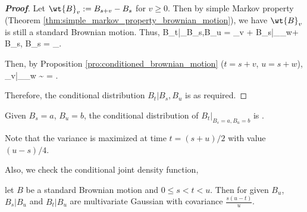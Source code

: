 \begin{proof}[\bf Proof]
Let $\wt{B}_v := B_{s+v} - B_s$ for $v\geq 0$. Then by simple Markov property (Theorem \ref{thm:simple_markov_property_brownian_motion}), we have $\wt{B}_v$ is still a standard Brownian motion. Thus,
\be
B_t|_{B_s,B_u} = _v + B_s|_{_w+ B_s, B_s} = _{}.
\ee

Then, by Proposition \ref{pro:conditioned_brownian_motion} ($t = s+v$, $u = s+w$),
\be
{}_v|_{_w} \sim \sN{} = \sN{}.
\ee

Therefore, the conditional distribution $B_t|B_s,B_u$ is as required.
\end{proof}

\begin{example}
Given $B_s = a$, $B_u = b$, the conditional distribution of $B_t|_{B_s =a,B_u=b}$ is
\be
\sN{}.
\ee

Note that the variance is maximized at time $t = (s+u)/2$ with value $(u-s)/4$.
\end{example}

Also, we check the conditional joint density function,%

\begin{lemma}\label{lem:joint_conditional_brownian_motion}
let $B$ be a standard Brownian motion and $0\leq s<t<u$. Then for given $B_u$, $B_s|B_u$ and $B_t|B_u$ are multivariate Gaussian with covariance $\frac{s(u-t)}{u}$.
\end{lemma}

